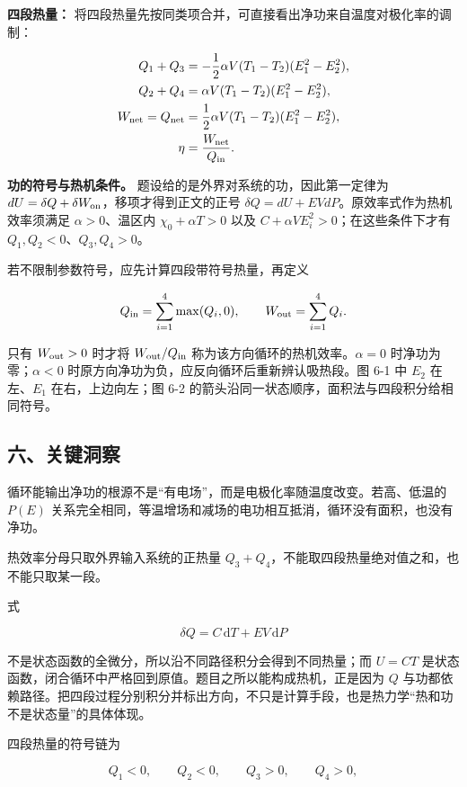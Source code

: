 \documentclass[12pt,a4paper,UTF8]{ctexart}
\begin{document}
\textbf{四段热量：}
将四段热量先按同类项合并，可直接看出净功来自温度对极化率的调制：

\[\begin{aligned}
Q_1+Q_3&=-\frac12\alpha V(T_1-T_2)(E_1^2-E_2^2),\\
Q_2+Q_4&=\alpha V(T_1-T_2)(E_1^2-E_2^2),\\
W_{\rm net}=Q_{\rm net}
&=\frac12\alpha V(T_1-T_2)(E_1^2-E_2^2),\\
\eta&=\frac{W_{\rm net}}{Q_{\rm in}}.
\end{aligned}\]

\textbf{功的符号与热机条件。} 题设给的是外界对系统的功，因此第一定律为
\(dU=\delta Q+\delta W_{\rm on}\)，移项才得到正文的正号
\(\delta Q=dU+EVdP\)。原效率式作为热机效率须满足 \(\alpha>0\)、温区内
\(\chi_0+\alpha T>0\) 以及 \(C+\alpha VE_i^2>0\)；在这些条件下才有
\(Q_1,Q_2<0\)、\(Q_3,Q_4>0\)。

若不限制参数符号，应先计算四段带符号热量，再定义

\[Q_{\rm in}=\sum_{i=1}^4\max(Q_i,0),\qquad W_{\rm out}=\sum_{i=1}^4Q_i.\]

只有 \(W_{\rm out}>0\) 时才将 \(W_{\rm out}/Q_{\rm in}\)
称为该方向循环的热机效率。\(\alpha=0\) 时净功为零；\(\alpha<0\)
时原方向净功为负，应反向循环后重新辨认吸热段。图 6-1 中 \(E_2\)
在左、\(E_1\) 在右，上边向左；图 6-2
的箭头沿同一状态顺序，面积法与四段积分给相同符号。

\subsection{六、关键洞察}\label{ux516dux5173ux952eux6d1eux5bdf-5}

循环能输出净功的根源不是``有电场''，而是电极化率随温度改变。若高、低温的
\(P(E)\)
关系完全相同，等温增场和减场的电功相互抵消，循环没有面积，也没有净功。

热效率分母只取外界输入系统的正热量
\(Q_3+Q_4\)，不能取四段热量绝对值之和，也不能只取某一段。

式

\[\delta Q=C\,\mathrm dT+EV\,\mathrm dP\]

不是状态函数的全微分，所以沿不同路径积分会得到不同热量；而 \(U=CT\)
是状态函数，闭合循环中严格回到原值。题目之所以能构成热机，正是因为 \(Q\)
与功都依赖路径。把四段过程分别积分并标出方向，不只是计算手段，也是热力学``热和功不是状态量''的具体体现。

四段热量的符号链为

\[Q_1<0,\qquad Q_2<0,
\qquad Q_3>0,\qquad Q_4>0,\]
\end{document}
